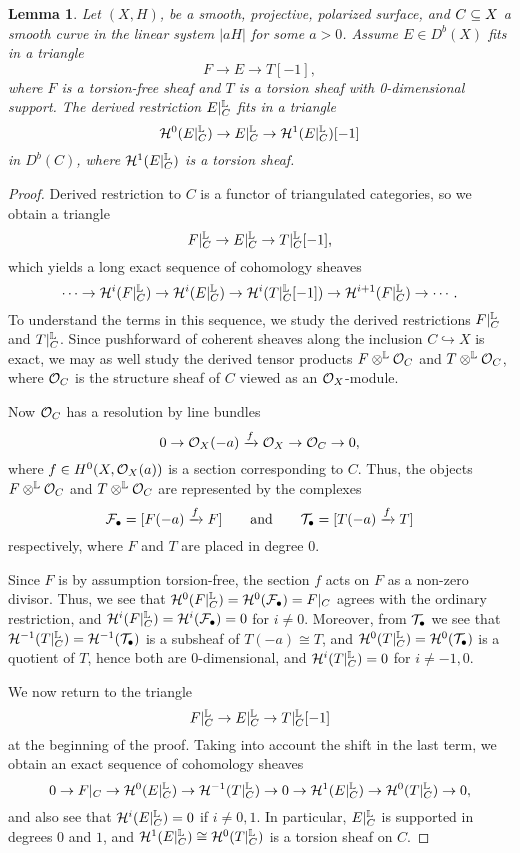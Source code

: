 \documentclass[letterpaper,11pt]{amsart}%
\newtheorem{lem}[thm]{Lemma}
\theoremstyle{remark}
\begin{document}
\begin{lem}\label{restsingle} Let $(X, H)$, be a smooth, projective, polarized surface, and $C \subseteq X$ a smooth curve in the linear system $|a H|$ for some $a > 0$. Assume $E \in D^b(X)$ fits in a triangle
\[ F \to E \to T[-1], \]
where $F$ is a torsion-free sheaf and $T$ is a torsion sheaf with 0-dimensional support. The derived restriction $E|_C^{\mathbb{L}}$ fits in a triangle
\[ \mathcal{H}^0(E|_C^{\mathbb{L}}) \to E|_C^{\mathbb{L}} \to \mathcal{H}^1(E|_C^{\mathbb{L}})[-1] \]
in $D^b(C)$, where $\mathcal{H}^1(E|_C^{\mathbb{L}})$ is a torsion sheaf.
\end{lem}
\begin{proof}
Derived restriction to $C$ is a functor of triangulated categories, so we obtain a triangle
\[ F|_C^{\mathbb{L}} \to E|_C^{\mathbb{L}} \to T|_C^{\mathbb{L}}[-1], \]
which yields a long exact sequence of cohomology sheaves
\[ \cdots \to \mathcal{H}^i(F|_C^{\mathbb{L}}) \to \mathcal{H}^i(E|_C^{\mathbb{L}}) \to \mathcal{H}^i(T|_C^{\mathbb{L}}[-1]) \to \mathcal{H}^{i+1}(F|_C^{\mathbb{L}}) \to \cdots. \]
To understand the terms in this sequence, we study the derived restrictions $F|_C^{\mathbb{L}}$ and $T|_C^{\mathbb{L}}$. Since pushforward of coherent sheaves along the inclusion $C \hookrightarrow X$ is exact, we may as well study the derived tensor products $F \otimes^{\mathbb{L}} \mathcal{O}_C$ and $T \otimes^{\mathbb{L}} \mathcal{O}_C$, where $\mathcal{O}_C$ is the structure sheaf of $C$ viewed as an $\mathcal{O}_X$-module. 

Now $\mathcal{O}_C$ has a resolution by line bundles
\[ 0 \to \mathcal{O}_X(-a) \xrightarrow{f} \mathcal{O}_X \to \mathcal{O}_C \to 0, \]
where $f \in H^0(X,\mathcal{O}_X(a))$ is a section corresponding to $C$. Thus, the objects $F \otimes^{\mathbb{L}} \mathcal{O}_C$ and $T \otimes^{\mathbb{L}} \mathcal{O}_C$ are represented by the complexes
\[ \mathcal{F}_\bullet = [F(-a) \xrightarrow{f} F] \qquad \mathrm{and} \qquad \mathcal{T}_\bullet = [T(-a) \xrightarrow{f} T] \]
respectively, where $F$ and $T$ are placed in degree 0. 

Since $F$ is by assumption torsion-free, the section $f$ acts on $F$ as a non-zero divisor. Thus, we see that $\mathcal{H}^0(F|_C^{\mathbb{L}}) = \mathcal{H}^0(\mathcal{F}_\bullet) = F|_C$ agrees with the ordinary restriction, and $\mathcal{H}^i(F|_C^{\mathbb{L}}) = \mathcal{H}^i(\mathcal{F}_\bullet) = 0$ for $i \neq 0$. Moreover, from $\mathcal{T}_\bullet$ we see that $\mathcal{H}^{-1}(T|_C^{\mathbb{L}}) = \mathcal{H}^{-1}(\mathcal{T}_\bullet)$ is a subsheaf of $T(-a) \cong T$, and $\mathcal{H}^0(T|_C^{\mathbb{L}}) = \mathcal{H}^0(\mathcal{T}_\bullet)$ is a quotient of $T$, hence both are 0-dimensional, and $\mathcal{H}^i(T|_C^{\mathbb{L}}) = 0$ for $i \neq -1, 0$.

We now return to the triangle
\[ F|_C^{\mathbb{L}} \to E|_C^{\mathbb{L}} \to T|_C^{\mathbb{L}}[-1] \]
at the beginning of the proof. Taking into account the shift in the last term, we obtain an exact sequence of cohomology sheaves
\[ 0 \to F|_C \to \mathcal{H}^0(E|_C^{\mathbb{L}}) \to \mathcal{H}^{-1}(T|_C^{\mathbb{L}}) \to 0 \to \mathcal{H}^1(E|_C^{\mathbb{L}}) \to \mathcal{H}^0(T|_C^{\mathbb{L}}) \to 0, \]
and also see that $\mathcal{H}^i(E|_C^{\mathbb{L}}) = 0$ if $i \neq 0,1$. In particular, $E|_C^{\mathbb{L}}$ is supported in degrees $0$ and $1$, and $\mathcal{H}^1(E|_C^{\mathbb{L}}) \cong \mathcal{H}^0(T|_C^{\mathbb{L}})$ is a torsion sheaf on $C$.


\end{proof}
\end{document}
